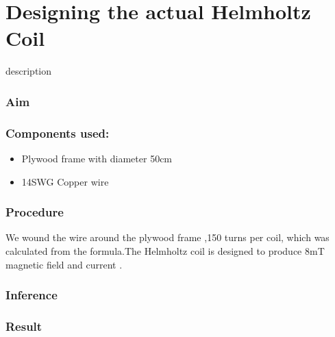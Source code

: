 \chapter{Designing the actual Helmholtz Coil}

\vspace{15pt}

description



\subsection{Aim}

\subsection{Components used:}

\vspace{15pt}

\begin{itemize}

  \item Plywood frame with diameter 50cm
  \item 14SWG Copper wire
  
\end{itemize}



\subsection{Procedure}
We wound the wire around the plywood frame ,150 turns per coil, which was calculated from the formula.The Helmholtz coil is designed to produce 8mT magnetic field and   current .


\subsection{Inference}

\subsection{Result}
